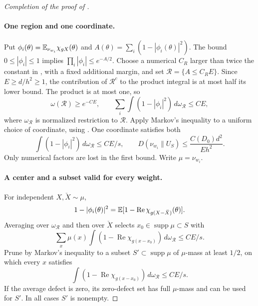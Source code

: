 \begin{proof}[Completion of the proof of ]
\paragraph{One region and one coordinate.}
Put $\phi_i(\theta)=\mathbb E_{\nu_{w_i}}\chi_{gX}(\theta)$ and
$A(\theta)=\sum_i(1-|\phi_i(\theta)|^2)$.
The bound $0\le|\phi_i|\le1$ implies
$\prod_i|\phi_i|\le e^{-A/2}$.
Choose a numerical $C_R$ larger than twice the constant in
, with a fixed additional margin, and
set $\mathcal R=\{A\le C_RE\}$.
Since $E\ge d/h^2\ge1$, the contribution of $\mathcal R^c$ to the product
integral is at most half its lower bound. The product is at most one, so
\begin{equation}
 \omega(\mathcal R)\ge e^{-CE},\qquad
 \sum_i\int(1-|\phi_i|^2)\,d\omega_{\mathcal R}\le CE,
 \label{entropy-refinement:region}
\end{equation}
where $\omega_{\mathcal R}$ is normalized restriction to $\mathcal R$.
Apply Markov's inequality to a uniform choice of coordinate, using
.
One coordinate satisfies both
\begin{equation}
 \int(1-|\phi_i|^2)\,d\omega_{\mathcal R}\le CE/s,\qquad
 D(\nu_{w_i}\|U_S)\le\frac{C(D_0)d^2}{Eh^2}.
 \label{entropy-refinement:coordinate}
\end{equation}
Only numerical factors are lost in the first bound. Write $\mu=\nu_{w_i}$.

\paragraph{A center and a subset valid for every weight.}
For independent $X,\breve X\sim\mu$,
\[
 1-|\phi_i(\theta)|^2
 =\mathbb E[1-\operatorname{Re}\chi_{g(X-\breve X)}(\theta)].
\]
Averaging over $\omega_{\mathcal R}$ and then over $\breve X$ selects
$x_0\in\operatorname{supp}\mu\subset S$ with
\[
 \sum_x\mu(x)\int(1-\operatorname{Re}\chi_{g(x-x_0)})
       \,d\omega_{\mathcal R}\le CE/s.
\]
Prune by Markov's inequality to a subset $S'\subset\operatorname{supp}\mu$
of $\mu$-mass at least $1/2$, on which every $x$ satisfies
\begin{equation}
 \int(1-\operatorname{Re}\chi_{g(x-x_0)})\,d\omega_{\mathcal R}\le CE/s.
 \label{entropy-refinement:pruned-defect}
\end{equation}
If the average defect is zero, its zero-defect set has full $\mu$-mass and
can be used for $S'$. In all cases $S'$ is nonempty.


\end{proof}
